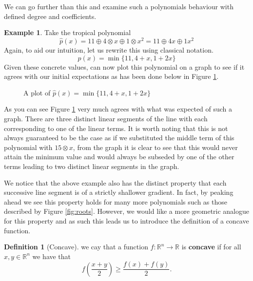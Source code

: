 \documentclass[12pt,a4paper]{amsart}
\newcommand{\R}{\mathbb{R}}
\theoremstyle{definition}
\newtheorem{defn}{Definition}[section]
\newtheorem{ex}{Example}[section]
\theoremstyle{remark}
\begin{document}
We can go further than this and examine such a polynomials behaviour with defined degree and coefficients.
\begin{ex}
Take the tropical polynomial
\begin{equation}
    \hat{p}(x) = 11\oplus4\otimes x\oplus1\otimes x^2 = 11\oplus4x\oplus1x^2
\end{equation}
Again, to aid our intuition, let us rewrite this using classical notation.
\begin{equation}
    \hat{p}(x) = \min\{11,4+x,1+2x\}
\end{equation}
Given these concrete values, can now plot this polynomial on a graph to see if it agrees with our initial expectations as has been done below in Figure \ref{fig:poly}.
\begin{figure}[h]
\centering
{}
\caption{A plot of $\hat{p}(x) = \min\{11,4+x,1+2x\}$}
\label{fig:poly}
\end{figure}

As you can see Figure \ref{fig:poly} very much agrees with what was expected of such a graph. There are three distinct linear segments of the line with each corresponding to one of the linear terms. It is worth noting that this is not always guaranteed to be the case as if we substituted the middle term of this polynomial with $15\otimes x$, from the graph it is clear to see that this would never attain the minimum value and would always be subseded by one of the other terms leading to two distinct linear segments in the graph.
\end{ex}

We notice that the above example also has the distinct property that each successive line segment is of a strictly shallower gradient. In fact, by peaking ahead we see this property holds for many more polynomials such as those described by Figure \ref{fig:roots}. However, we would like a more geometric analogue for this property and as such this leads us to introduce the definition of a concave function.

\begin{defn}[Concave]\label{def:concave}
we cay that a function $f:\R^n\to\R$ is \textbf{concave} if for all $x,y\in\R^n$ we have that
\begin{equation}\label{eq:concave}
    f\left(\frac{x+y}{2}\right) \geq \frac{f(x) + f(y)}{2}.
\end{equation}
\end{defn}
\end{document}
